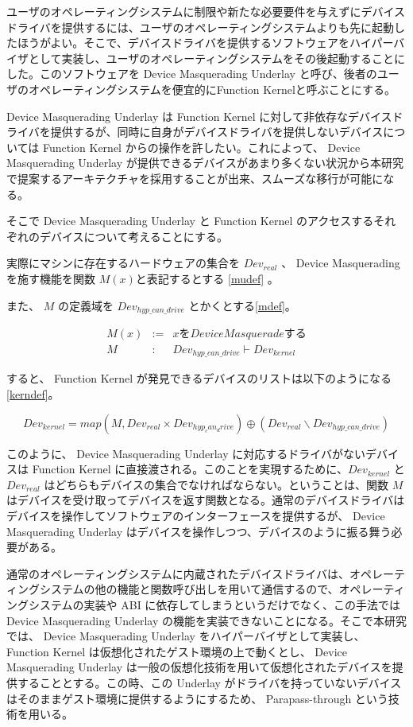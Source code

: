 \documentclass[a4paper,11pt,report]{ltjsbook}
\begin{document}
ユーザのオペレーティングシステムに制限や新たな必要要件を与えずにデバイスドライバを提供するには、ユーザのオペレーティングシステムよりも先に起動したほうがよい。そこで、デバイスドライバを提供するソフトウェアをハイパーバイザとして実装し、ユーザのオペレーティングシステムをその後起動することにした。このソフトウェアを Device Masquerading Underlay と呼び、後者のユーザのオペレーティングシステムを便宜的にFunction Kernelと呼ぶことにする。

Device Masquerading Underlay は Function Kernel に対して非依存なデバイスドライバを提供するが、同時に自身がデバイスドライバを提供しないデバイスについては Function Kernel からの操作を許したい。これによって、 Device Masquerading Underlay が提供できるデバイスがあまり多くない状況から本研究で提案するアーキテクチャを採用することが出来、スムーズな移行が可能になる。

そこで Device Masquerading Underlay と Function Kernel のアクセスするそれぞれのデバイスについて考えることにする。

実際にマシンに存在するハードウェアの集合を $ Dev_{real} $ 、 Device Masquerading を施す機能を関数 $ M(x) $と表記するとする \ref{mudef} 。

また、 $M$ の定義域を $ Dev_{hyp\_can\_drive} $ とかくとする\ref{mdef}。

\begin{eqnarray}
M(x) & := & x を Device Masquerade する\label{mudef}\\
M & : & Dev_{hyp\_can\_drive} \vdash Dev_{kernel}\label{mdef}
\end{eqnarray}

すると、 Function Kernel が発見できるデバイスのリストは以下のようになる \ref{kerndef}。

\begin{equation}
Dev_{kernel} = map(M, Dev_{real} \times Dev_{hyp_can_drive}) \oplus (Dev_{real} \backslash Dev_{hyp\_can\_drive}) \label{kerndef}
\end{equation}

このように、 Device Masquerading Underlay に対応するドライバがないデバイスは Function Kernel に直接渡される。このことを実現するために、$Dev_{kernel}$ と $Dev_{real}$ はどちらもデバイスの集合でなければならない。ということは、関数 $M$ はデバイスを受け取ってデバイスを返す関数となる。通常のデバイスドライバはデバイスを操作してソフトウェアのインターフェースを提供するが、 Device Masquerading Underlay はデバイスを操作しつつ、デバイスのように振る舞う必要がある。

通常のオペレーティングシステムに内蔵されたデバイスドライバは、オペレーティングシステムの他の機能と関数呼び出しを用いて通信するので、オペレーティングシステムの実装や ABI に依存してしまうというだけでなく、この手法では Device Masquerading Underlay の機能を実装できないことになる。そこで本研究では、 Device Masquerading Underlay をハイパーバイザとして実装し、 Function Kernel は仮想化されたゲスト環境の上で動くとし、 Device Masquerading Underlay は一般の仮想化技術を用いて仮想化されたデバイスを提供することとする。この時、この Underlay がドライバを持っていないデバイスはそのままゲスト環境に提供するようにするため、 Parapass-through \cite{bitvisor} という技術を用いる。
\end{document}
